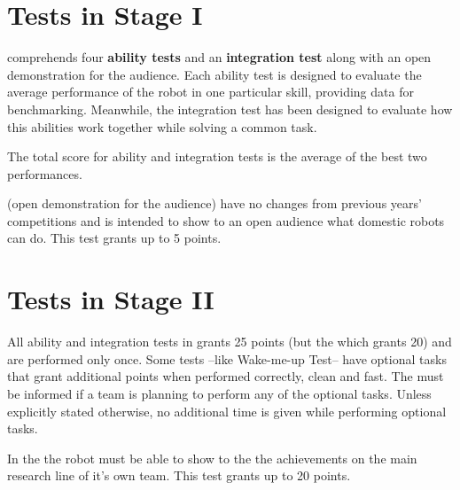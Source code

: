 \documentclass[11pt, twoside, openright, a4paper, chapterprefix]{scrbook}
\begin{document}


\pagestyle{empty}

\clearpage

\pagestyle{empty}
\tableofcontents
\clearpage

\pagestyle{plain}









\chapter{Tests in Stage I}
\label{chap:stage_I}

\begin{itshape}
 comprehends four \textbf{ability tests} and an \textbf{integration test} along with an open demonstration for the audience. Each ability test is designed to evaluate the average performance of the robot in one particular skill, providing data for benchmarking. Meanwhile, the integration test has been designed to evaluate how this abilities work together while solving a common task.

The total score for ability and integration tests is the average of the best two performances.

 (open demonstration for the audience) have no changes from previous years' competitions and is intended to show to an open audience what domestic robots can do. This test grants up to 5 points.
\end{itshape}

\newpage


\newpage


\newpage


\newpage


\newpage


\newpage



\chapter{Tests in Stage II}
\label{chap:stage_II}

\begin{itshape}
All ability and integration tests in  grants 25 points (but the  which grants 20) and are performed only once. Some tests --like Wake-me-up Test-- have optional tasks that grant additional points when performed correctly, clean and fast. The  must be informed if a team is planning to perform any of the optional tasks. Unless explicitly stated otherwise, no additional time is given while performing optional tasks.

In the  the robot must be able to show to the  the achievements on the main research line of it's own team. This test grants up to 20 points.

\end{itshape}
\end{document}
